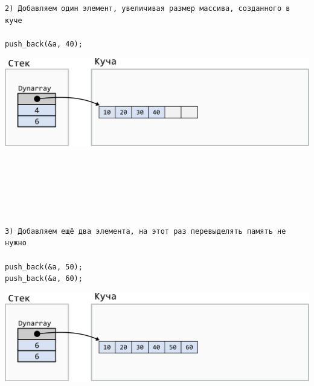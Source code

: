 \documentclass{article}
\begin{document}
\noindent\begin{minipage}{.40\textwidth}
\begin{lstlisting}
2) Добавляем один элемент, увеличивая размер массива, созданного в куче

push_back(&a, 40);
\end{lstlisting}
\end{minipage}
\begin{minipage}{.50\textwidth}
\includegraphics[scale=0.8]{../images/dynarray2.png}
\end{minipage}
\quad\\
\quad\\
\quad\\
\quad\\
\quad\\



\noindent\begin{minipage}{.40\textwidth}
\begin{lstlisting}
3) Добавляем ещё два элемента, на этот раз перевыделять память не нужно

push_back(&a, 50);
push_back(&a, 60);
\end{lstlisting}
\end{minipage}
\begin{minipage}{.50\textwidth}
\includegraphics[scale=0.8]{../images/dynarray3.png}
\end{minipage}
\quad\\
\quad\\
\quad\\
\quad\\
\quad\\
\end{document}
